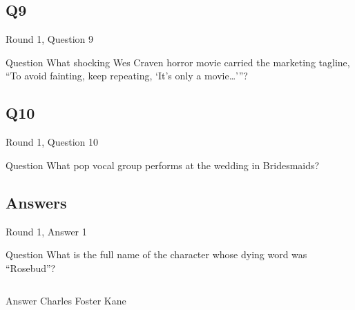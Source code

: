 \documentclass[11pt]{beamer}
\begin{document}
\subsection*{Q9}
\begin{frame}[t]{Round 1, Question 9}
  \vspace{2em}
  \begin{block}{Question}
    What shocking Wes Craven horror movie carried the marketing tagline, ``To avoid fainting, keep repeating, `It's only a movie…'{}''?
  \end{block}
\end{frame}


\subsection*{Q10}
\begin{frame}[t]{Round 1, Question 10}
  \vspace{2em}
  \begin{block}{Question}
    What pop vocal group performs at the wedding in Bridesmaids?
  \end{block}
\end{frame}

\subsection{Answers}

\begin{frame}[t]{Round 1, Answer 1}
  \vspace{2em}
  \begin{block}{Question}
    What is the full name of the character whose dying word was ``Rosebud''?
  \end{block}
  \pause{}
  \begin{columns}[T,totalwidth=\linewidth]
    \begin{column}{0.35\linewidth}
      \begin{block}{Answer}
        Charles Foster Kane
      \end{block}
    \end{column}
    \begin{column}{0.6\linewidth}
      \begin{center}
        \texttt{[image: \{Images/citizenkane]}.jpg}
      \end{center}
    \end{column}
  \end{columns}
\end{frame}
\end{document}
